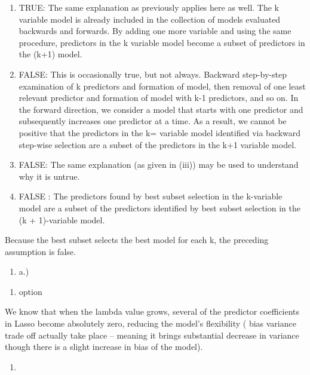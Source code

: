 \documentclass[
]{article}
\providecommand{\tightlist}{%
  \setlength{\itemsep}{0pt}\setlength{\parskip}{0pt}}
\begin{document}
\begin{enumerate}
\def\labelenumi{\roman{enumi})}
\setcounter{enumi}{1}
\item
  TRUE: The same explanation as previously applies here as well. The k
  variable model is already included in the collection of models
  evaluated backwards and forwards. By adding one more variable and
  using the same procedure, predictors in the k variable model become a
  subset of predictors in the (k+1) model.
\item
  FALSE: This is occasionally true, but not always. Backward
  step-by-step examination of k predictors and formation of model, then
  removal of one least relevant predictor and formation of model with
  k-1 predictors, and so on. In the forward direction, we consider a
  model that starts with one predictor and subsequently increases one
  predictor at a time. As a result, we cannot be positive that the
  predictors in the k= variable model identified via backward step-wise
  selection are a subset of the predictors in the k+1 variable model.
\item
  FALSE: The same explanation (as given in (iii)) may be used to
  understand why it is untrue.
\item
  FALSE : The predictors found by best subset selection in the
  k-variable model are a subset of the predictors identified by best
  subset selection in the (k + 1)-variable model.
\end{enumerate}

Because the best subset selects the best model for each k, the preceding
assumption is false.

\begin{enumerate}
\def\labelenumi{\arabic{enumi})}
\setcounter{enumi}{1}
\tightlist
\item
  a.)
\end{enumerate}

\begin{enumerate}
\def\labelenumi{(\roman{enumi})}
\setcounter{enumi}{2}
\tightlist
\item
  option
\end{enumerate}

We know that when the lambda value grows, several of the predictor
coefficients in Lasso become absolutely zero, reducing the model's
flexibility ( bias variance trade off actually take place -- meaning it
brings substantial decrease in variance though there is a slight
increase in bias of the model).

\begin{enumerate}
\def\labelenumi{\alph{enumi})}
\setcounter{enumi}{1}
\tightlist
\item
\end{enumerate}
\end{document}
